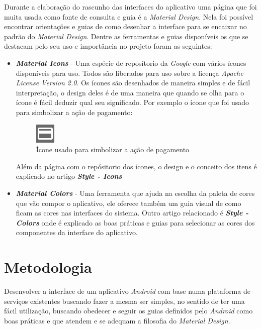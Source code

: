 \documentclass[hidelinks,12pt]{article}
\begin{document}
Durante a elabora\c{c}\~ao do rascunho das interfaces do aplicativo uma p\'agina \cite{material} que foi muita usada como fonte de consulta e guia \'e a \textit{Material Design}. Nela foi poss\'ivel encontrar orienta\c{c}\~oes e guias de como desenhar a interface para se encaixar no padr\~ao do \textit{Material Design}. Dentre as ferramentas e guias dispon\'iveis os que se destacam pelo seu uso e importância no projeto foram as seguintes:
\begin{itemize}
	\item \textbf{\textit{Material Icons}} \cite{materialicon} - Uma esp\'ecie de repos\'itorio da \textit{Google} com v\'arios \'icones dispon\'iveis para uso. Todos s\~ao liberados para uso sobre a licen\c{c}a \textit{Apache License Version 2.0}. Os \'icones s\~ao desenhados de maneira simples e de f\'acil interpreta\c{c}\~ao, o design deles \'e de uma maneira que quando se olha para o \'icone \'e f\'acil deduzir qual seu significado. Por exemplo o \'icone que foi usado para simbolizar a a\c{c}\~ao de pagamento:
	\begin{figure}[h]
		\centering
		\includegraphics{pay_action_white}
		\caption{\'Icone usado para simbolizar a a\c{c}\~ao de pagamento}
	\end{figure}
	
	Al\'em da p\'agina com o rep\'ositorio dos \'icones, o design e o conceito dos itens \'e explicado no artigo \textbf{\textit{Style - Icons}} \cite{materialiconguide}
	
	\item \textbf{\textit{Material Colors}} \cite{materialcolors} - Uma ferramenta \cite{materialcolorpallete} que ajuda na escolha da paleta de cores que v\~ao compor o aplicativo, ele oferece tamb\'em um guia visual de como ficam as cores nas interfaces do sistema. Outro artigo relacionado \'e \textbf{\textit{Style - Colors}} \cite{materialcolors} onde \'e explicado as boas pr\'aticas e guias para selecionar as cores dos componentes da interface do aplicativo.
\end{itemize}
\newpage
\section{Metodologia}
Desenvolver a interface de um aplicativo \textit{Android} com base numa plataforma de servi\c{c}os existentes buscando fazer a mesma ser simples, no sentido de ter uma f\'acil utiliza\c{c}\~ao, buscando obedecer e seguir os guias definidos pelo \textit{Android} como boas pr\'aticas e que atendem e se adequam a filosofia do \textit{Material Design}.
\end{document}
